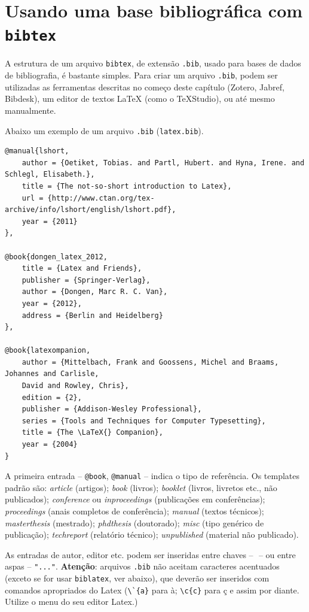 \section{Usando uma base bibliográfica com \texttt{bibtex}}
\label{bibtex}

A estrutura de um arquivo \texttt{bibtex}, de extensão \texttt{.bib}, usado para bases de dados de bibliografia, é bastante simples. Para criar um arquivo \texttt{.bib}, podem ser utilizadas as ferramentas descritas no começo deste capítulo (Zotero, Jabref, Bibdesk), um editor de textos \LaTeX{} (como o TeXStudio), ou até mesmo manualmente.

Abaixo um exemplo de um arquivo \texttt{.bib} (\texttt{latex.bib}). \label{latex-bib}

\begin{verbatim}
@manual{lshort,
    author = {Oetiket, Tobias. and Partl, Hubert. and Hyna, Irene. and Schlegl, Elisabeth.},
    title = {The not-so-short introduction to Latex},
    url = {http://www.ctan.org/tex-archive/info/lshort/english/lshort.pdf},
    year = {2011}
},

@book{dongen_latex_2012,
	title = {Latex and Friends},
	publisher = {Springer-Verlag},
	author = {Dongen, Marc R. C. Van},
	year = {2012},
	address = {Berlin and Heidelberg}
},

@book{latexompanion,
    author = {Mittelbach, Frank and Goossens, Michel and Braams, Johannes and Carlisle, 
    David and Rowley, Chris},
    edition = {2},
    publisher = {Addison-Wesley Professional},
    series = {Tools and Techniques for Computer Typesetting},
    title = {The \LaTeX{} Companion},
    year = {2004}
}

\end{verbatim}

A primeira entrada -- \verb+@book+, \verb+@manual+ -- indica o tipo de referência. Os templates padrão são: \textit{article} (artigos); \textit{book} (livros); \textit{booklet} (livros, livretos etc., não publicados); \textit{conference} ou \textit{inproceedings} (publicações em conferências); \textit{proceedings} (anais completos de conferência); \textit{manual} (textos técnicos); \textit{masterthesis} (mestrado); \textit{phdthesis} (doutorado); \textit{misc} (tipo genérico de publicação); \textit{techreport} (relatório técnico); \textit{unpublished} (material não publicado).

As entradas de autor, editor etc. podem ser inseridas entre chaves -- ${}$ -- ou entre aspas -- \verb+"..."+. 
\textbf{Atenção}: arquivos \texttt{.bib} não aceitam caracteres acentuados (exceto se for usar \texttt{biblatex}, ver abaixo), que deverão ser inseridos com comandos apropriados do Latex (\verb+\`{a}+ para à; \verb+\c{c}+ para ç e assim por diante. Utilize o menu do seu editor Latex.)


